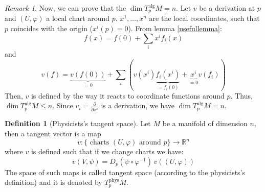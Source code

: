 \documentclass[a4paper,11pt,titlepage, article, oneside]{memoir}
\numberwithin{equation}{section}
\theoremstyle{definition}
\newtheorem{definition}[theorem]{Definition}
\theoremstyle{remark}
\newtheorem{remark}[theorem]{Remark}
\newcommand{\rfield}{\mathbb{R}}
\newcommand{\deonde}[1]{\frac{\partial}{\partial {#1}}}
\newcommand{\tangentphys}[1]{T_{#1}^{\text{phys}}}
\newcommand{\tangentalg}[1]{T_{#1}^{\text{alg}}}
\begin{document}
\begin{remarkbox}\begin{remark}
Now, we can prove that the $\dim \tangentalg{p} M = n$. Let $v$ be a derivation at $p$ and $(U, \varphi)$ a local chart around $p$. $x^1, \ldots, x^n$ are the local coordinates, such that $p$ coincides with the origin ($x^i(p) = 0$). From lemma \ref{usefullemma}:
$$f(x) = f(0) + \sum\limits_i x^i f_i(x)$$
and
$$v(f) = \underbrace{v(f(0))}_{=0} + \sum\limits_i \left( v(x^i) \underbrace{f_i(x^i)}_{=f_i(0)} + \underbrace{x^i}_{=0} v(f_i) \right)$$
Then, $v$ is defined by the way it reacts to coordinate functions around $p$. Thus, $\dim \tangentalg{p} M \le n$. Since $v_i = \deonde{x^i}$ is a derivation, we have $\dim \tangentalg{p} M = n$.
\end{remark}\end{remarkbox}

\begin{definition}[Physicists's tangent space]
Let $M$ be a manifold of dimension $n$, then a tangent vector is a map
\begin{equation}
v \colon \{ \text{ charts } (U, \varphi) \text{ around } p \} \rightarrow \rfield^n
\end{equation}
where $v$ is defined such that if we change charts we have:
\begin{equation} \label{phystransf}
v(V, \psi) = D_p (\psi \circ \varphi^{-1})\, v((U, \varphi))
\end{equation}
The space of such maps is called tangent space (according to the physicists's definition) and it is denoted by $\tangentphys{p} M$.
\end{definition}
\end{document}

